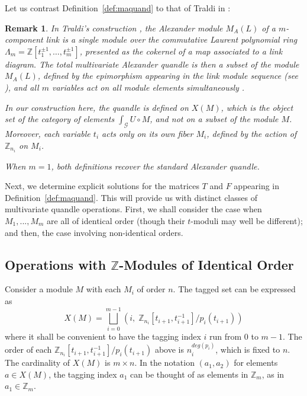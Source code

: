 \documentclass[a4paper,12pt]{article}
\newtheorem{remark}{Remark}[section]
\newcommand{\Z}{\mathbb{Z}}
\newcommand{\Lam}{\Lambda}
\newcommand{\calG}{\mathcal{G}}
\newcommand{\Gint}[1]{\int_{#1}}
\begin{document}
Let us contrast Definition~\ref{def:maquand} to that of Traldi in \cite{traldi1}:
\begin{remark}   
In Traldi's construction \cite{traldi1}, the Alexander module $M_A(L)$ of a $m$-component link is a single module over the commutative Laurent polynomial ring $\Lam_m = \mathbb{Z}[t_1^{\pm 1}, \ldots, t_m^{\pm 1}]$, presented as the cokernel of a map associated to a link diagram. The total multivariate Alexander quandle is then a subset of the module $M_A(L)$, defined by the  epimorphism appearing in the link module sequence  (see   \cite{crowell1969elementary, hillman1981alexander}),  and all $m$ variables act on all module elements simultaneously \cite{traldi1}. 

In our construction here, the quandle is defined on $X(M)$, which is the object set of the category of elements  $\Gint{\calG} U \circ M$, and not on a subset of the module $M$. Moreover, each variable $t_i$ acts only on its own 
fiber $M_i$, defined by the action of $\Z_{n_i}$ on $M_i$.

When $m = 1$, both definitions recover the standard Alexander quandle.  
\end{remark}

Next, we determine explicit solutions for the matrices $T$ and $F$ appearing in Definition~\ref{def:maquand}. This will provide us with distinct classes of multivariate quandle operations. First, we shall consider the case when    $M_1, ... , M_m$ are all of identical order (though their $t$-moduli may well be different); and then, the case involving non-identical orders. 


\subsection{Operations with $\Z$-Modules of Identical Order}

Consider a module $M$ with each $M_i$ of order $n$. The tagged set can be expressed as 
\[  X(M) = \bigsqcup_{i=0}^{m - 1} ( i, \;  \Z_{n_i} [t_{i+1}, t_{i+1}^{-1}]/p_i (t_{i+1}) )   \]   
where it shall be convenient to have the tagging index $i$ run from $0$ to $m-1$. The order of each $\Z_{n_i} [t_{i+1}, t_{i+1}^{-1}]/p_i (t_{i+1})$ above is 
$n_i^{deg (p_i)}$, which is fixed to $n$. The cardinality of $X(M)$ is $m \times n$.  In the notation $(a_1, a_2)$ for elements $a \in X(M)$, the tagging index $a_1$ can be thought of as elements in $\Z_m$, as in $a_1 \in \Z_m$.  
\end{document}
